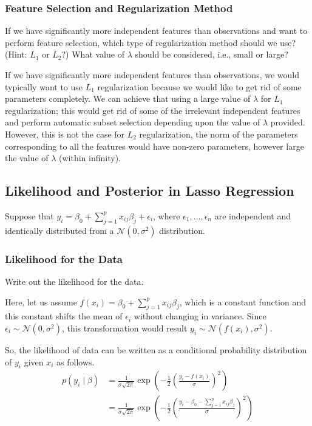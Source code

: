 \documentclass{article}
\begin{document}
\subsubsection{Feature Selection and Regularization Method}
\question
If we have significantly more independent features than observations and want to perform feature selection, which type of regularization method should we use? (Hint: $L_1$ or $L_2$?) What value of $\lambda$ should be considered, i.e., small or large?

\answer
If we have significantly more independent features than observations, we would typically want to use $L_1$ regularization because we would like to get rid of some parameters completely.
We can achieve that using a large value of $\lambda$ for $L_1$ regularization; this would get rid of some of the irrelevant independent features and perform automatic subset selection depending upon the value of $\lambda$ provided.
However, this is not the case for $L_2$ regularization, the norm of the parameters corresponding to all the features would have non-zero parameters, however large the value of $\lambda$ (within infinity).

\subsection{Likelihood and Posterior in Lasso Regression}
Suppose that $y_i = \beta_0 + \sum_{j=1}^{p} x_{ij} \beta_j + \epsilon_i$, where $\epsilon_1, \ldots, \epsilon_n$ are independent and identically distributed from a $\mathcal{N}\left(0, \sigma^2\right)$ distribution.

\subsubsection{Likelihood for the Data}

\question
Write out the likelihood for the data.

\answer
Here, let us assume $f\left(x_i\right) = \beta_0 + \sum_{j=1}^{p} x_{ij} \beta_j$, which is a constant function and this constant shifts the mean of $\epsilon_i$ without changing in variance.
Since $\epsilon_i \sim \mathcal{N}\left(0, \sigma^2\right)$, this transformation would result $y_i \sim \mathcal{N}\left(f\left(x_i\right), \sigma^2\right)$.

So, the likelihood of data can be written as a conditional probability distribution of $y_i$ given $x_i$ as follows.
\begin{equation}
    \begin{split}
        p\left(y_i \mid \beta\right) &= \frac{1}{\sigma\sqrt{2\pi}} \exp \left(-\frac{1}{2} \left(\frac{y_i -f\left(x_i\right)}{\sigma}\right)^2\right) \\
        &= \frac{1}{\sigma\sqrt{2\pi}} \exp \left(-\frac{1}{2} \left(\frac{y_i - \beta_0 - \sum_{j=1}^{p} x_{ij} \beta_j}{\sigma}\right)^2\right)
    \end{split}
\end{equation}
\end{document}

